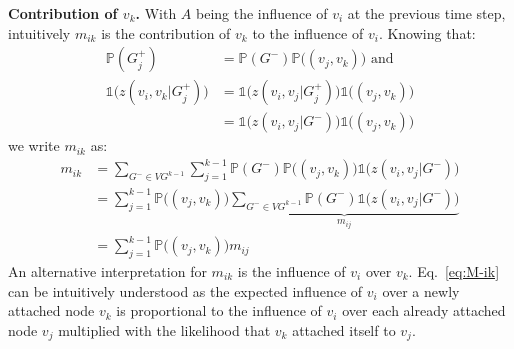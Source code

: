 \textbf{Contribution of $v_k$.}
With $A$ being the influence of $v_i$ at the previous time step, intuitively $m_{ik}$ is the contribution of $v_k$ to the influence of $v_i$.
Knowing that:
\begin{align*}
	\mathds{P}(G_j^+) &= \mathds{P}(G^-)\mathds{P}\big((v_j,v_k)\big) \text{ and } \\
	\mathds{1}\big(z(v_i,v_k|G_j^+)\big) &= \mathds{1}\big(z(v_i,v_j|G^+_j)\big) \mathds{1}\big((v_j,v_k)\big) \\
	 &= \mathds{1}\big(z(v_i,v_j|G^-)\big) \mathds{1}\big((v_j,v_k)\big)
\end{align*}
we write $m_{ik}$ as:
%
\begin{align}
	m_{ik} &= \sum_{G^- \in {VG^{k-1}}} \sum^{k-1}_{j=1} \mathds{P}(G^-)\mathds{P}\big((v_j,v_k)\big) \mathds{1}\big(z(v_i,v_j|G^-)\big) \nonumber \\
           &= \sum^{k-1}_{j=1} \mathds{P}\big((v_j,v_k)\big) \underbrace{ \sum_{G^- \in {VG^{k-1}}} \mathds{P}(G^-) \mathds{1}\big(z(v_i,v_j|G^-)\big)}_{m_{ij}} \nonumber \\  
		   &= \sum^{k-1}_{j=1} \mathds{P}\big((v_j,v_k)\big) m_{ij} \label{eq:M-ik}
\end{align}
An alternative interpretation for $m_{ik}$ is the influence of $v_i$ over $v_k$.
Eq.~\eqref{eq:M-ik} can be intuitively understood as the expected influence of $v_i$ over a newly attached node $v_k$ is proportional to the influence of $v_i$ over each already attached node $v_j$ multiplied with the likelihood that $v_k$ attached itself to $v_j$.
